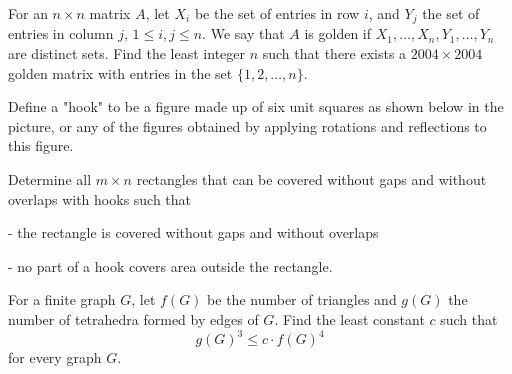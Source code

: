 \item[\textbf{C6.}]For an ${n\times n}$ matrix $A$,  let $X_{i}$ be the set of entries in row $i$,  and $Y_{j}$ the set of entries in column $j$,  ${1\leq i,j\leq n}$. We say that $A$ is golden if ${X_{1},\dots ,X_{n},Y_{1},\dots ,Y_{n}}$ are distinct sets. Find the least integer $n$ such that there exists a ${2004\times 2004}$ golden matrix with entries in the set ${\{1,2,\dots ,n\}}$.

\item[\textbf{C7.}]Define a "hook" to be a figure made up of six unit squares as shown below in the picture, or any of the figures obtained by applying rotations and reflections to this figure.


Determine all $ m\times n$ rectangles that can  be covered without gaps and without overlaps with hooks such that

- the rectangle is covered without gaps and without overlaps

- no part of a hook covers area outside the rectangle.

\item[\textbf{C8.}]For a finite graph $G$,  let $f(G)$ be the number of triangles and $g(G)$ the number of tetrahedra formed by edges of $G$. Find the least constant $c$ such that \[g(G)^3\le c\cdot f(G)^4\] for every graph $G$.